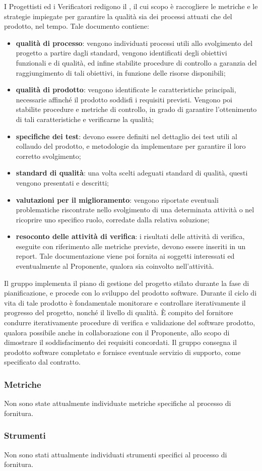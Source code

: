     I Progettisti ed i Verificatori redigono il \PdQ{}, il cui scopo è raccogliere le metriche e le strategie impiegate per garantire la qualità sia dei processi attuati che del prodotto, nel tempo. Tale documento contiene:
    \begin{itemize}
       		\item{\textbf{qualità di processo}: vengono individuati processi utili allo svolgimento del progetto a partire dagli standard, vengono identificati degli obiettivi funzionali e di qualità, ed infine stabilite procedure di controllo a garanzia del raggiungimento di tali obiettivi, in funzione delle risorse disponibili;}
       		\item{\textbf{qualità di prodotto}: vengono identificate le caratteristiche principali, necessarie affinché il prodotto soddisfi i requisiti previsti. Vengono poi stabilite procedure e metriche di controllo, in grado di garantire l'ottenimento di tali caratteristiche e verificarne la qualità;}
       		\item{\textbf{specifiche dei test}: devono essere definiti nel dettaglio dei test utili al collaudo del prodotto, e metodologie da implementare per garantire il loro corretto svolgimento;}
       		\item{\textbf{standard di qualità}: una volta scelti adeguati standard di qualità, questi vengono presentati e descritti;}
       		\item{\textbf{valutazioni per il miglioramento}: vengono riportate eventuali problematiche riscontrate nello svolgimento di una determinata attività o nel ricoprire uno specifico ruolo, corredate dalla relativa soluzione;}
       		\item{\textbf{resoconto delle attività di verifica}: i risultati delle attività di verifica, eseguite con riferimento alle metriche previste, devono essere inseriti in un report. Tale documentazione viene poi fornita ai soggetti interessati ed eventualmente al Proponente, qualora sia coinvolto nell'attività.}
    \end{itemize}   
    Il gruppo implementa il piano di gestione del progetto stilato durante la fase di pianificazione, e procede con lo sviluppo del prodotto software. Durante il ciclo di vita di tale prodotto è fondamentale monitorare e controllare iterativamente il progresso del progetto, nonché il livello di qualità.
    È compito del fornitore condurre iterativamente procedure di verifica e validazione del software prodotto, qualora possibile anche in collaborazione con il Proponente, allo scopo di dimostrare il soddisfacimento dei requisiti concordati.
    Il gruppo consegna il prodotto software completato e fornisce eventuale servizio di supporto, come specificato dal contratto.
    \subsubsection{Metriche}
    Non sono state attualmente individuate metriche specifiche al processo di fornitura.
    \subsubsection{Strumenti}
    Non sono stati attualmente individuati strumenti specifici al processo di fornitura.
       
    